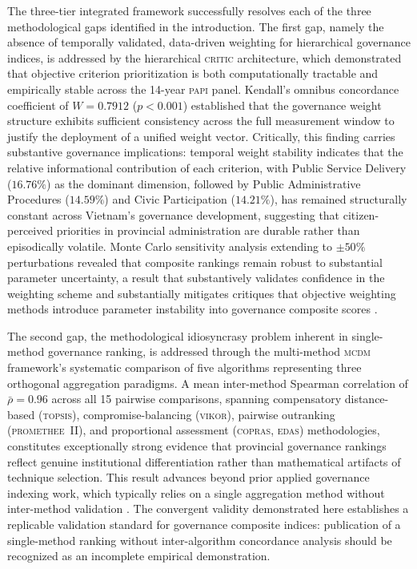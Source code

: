 \documentclass[12pt,a4paper]{article}
\newcommand{\PAPI}{\textsc{papi}\xspace}
\newcommand{\MCDM}{\textsc{mcdm}\xspace}
\newcommand{\CRITIC}{\textsc{critic}\xspace}
\newcommand{\TOPSIS}{\textsc{topsis}\xspace}
\newcommand{\VIKOR}{\textsc{vikor}\xspace}
\newcommand{\COPRAS}{\textsc{copras}\xspace}
\newcommand{\EDAS}{\textsc{edas}\xspace}
\newcommand{\PROMETHEE}{\textsc{promethee}\xspace}
\begin{document}
The three-tier integrated framework successfully resolves each of the three methodological gaps identified in the introduction. The first gap, namely the absence of temporally validated, data-driven weighting for hierarchical governance indices, is addressed by the hierarchical \CRITIC architecture, which demonstrated that objective criterion prioritization is both computationally tractable and empirically stable across the 14-year \PAPI panel. Kendall's omnibus concordance coefficient of $W = 0.7912$ ($p < 0.001$) established that the governance weight structure exhibits sufficient consistency across the full measurement window to justify the deployment of a unified weight vector. Critically, this finding carries substantive governance implications: temporal weight stability indicates that the relative informational contribution of each criterion, with Public Service Delivery ($16.76\%$) as the dominant dimension, followed by Public Administrative Procedures ($14.59\%$) and Civic Participation ($14.21\%$), has remained structurally constant across Vietnam's governance development, suggesting that citizen-perceived priorities in provincial administration are durable rather than episodically volatile. Monte Carlo sensitivity analysis extending to $\pm50\%$ perturbations revealed that composite rankings remain robust to substantial parameter uncertainty, a result that substantively validates confidence in the weighting scheme and substantially mitigates critiques that objective weighting methods introduce parameter instability into governance composite scores \citep{Greco2016, Becker2017}.

The second gap, the methodological idiosyncrasy problem inherent in single-method governance ranking, is addressed through the multi-method \MCDM framework's systematic comparison of five algorithms representing three orthogonal aggregation paradigms. A mean inter-method Spearman correlation of $\bar{\rho} = 0.96$ across all 15 pairwise comparisons, spanning compensatory distance-based (\TOPSIS), compromise-balancing (\VIKOR), pairwise outranking (\PROMETHEE~II), and proportional assessment (\COPRAS, \EDAS) methodologies, constitutes exceptionally strong evidence that provincial governance rankings reflect genuine institutional differentiation rather than mathematical artifacts of technique selection. This result advances beyond prior applied governance indexing work, which typically relies on a single aggregation method without inter-method validation \citep{Roy1996}. The convergent validity demonstrated here establishes a replicable validation standard for governance composite indices: publication of a single-method ranking without inter-algorithm concordance analysis should be recognized as an incomplete empirical demonstration.
\end{document}
